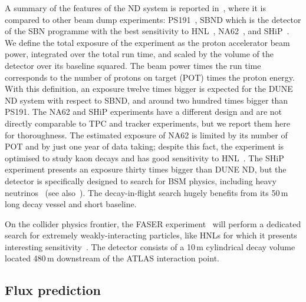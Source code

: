 A summary of the features of the ND system is reported in~, where it is compared to other beam dump experiments: %
PS191~\cite{Bernardi:1985ny,Bernardi:1987ek}, SBND which is the detector of the SBN programme with the best sensitivity to %
HNL~\cite{Ballett:2016opr}, NA62~\cite{NA62:2017rwk}, and SHiP~\cite{Anelli:2015pba}.
We define the total exposure of the experiment as the proton accelerator beam power, integrated over the total run time, %
and scaled by the volume of the detector over its baseline squared.
The beam power times the run time corresponds to the number of protons on target (POT) times the proton energy. 
With this definition, an exposure twelve times bigger is expected for the DUNE ND system with respect to SBND, %
and around two hundred times bigger than PS191.
The NA62 and SHiP experiments have a different design and are not directly comparable to TPC and tracker experiments, %
but we report them here for thoroughness.
The estimated exposure of NA62 is limited by its number of POT and by just one year of data taking; %
despite this fact, the experiment is optimised to study kaon decays and has good %
sensitivity to HNL~\cite{Drewes:2018irr}.
The SHiP experiment presents an exposure thirty times bigger than DUNE ND, but the detector is specifically %
designed to search for BSM physics, including heavy neutrinos~\cite{SHiP:2018xqw} (see also~).
The decay-in-flight search hugely benefits from its 50\,m long decay vessel and short baseline.

On the collider physics frontier, the FASER experiment~\cite{Ariga:2018uku} will perform a dedicated search for %
extremely weakly-interacting particles, like HNLs for which it presents interesting sensitivity~\cite{Kling:2018wct}.
The detector consists of a 10\,m cylindrical decay volume located 480\,m downstream of the ATLAS interaction point. 

\subsection{Flux prediction}
\label{sec:tauneutrino}


